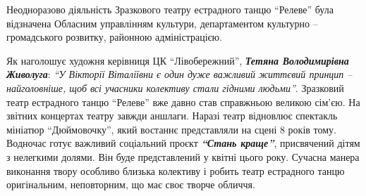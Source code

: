 
Неодноразово діяльність Зразкового театру естрадного танцю \enquote{Релеве} була
відзначена Обласним управлінням культури, департаментом культурно –
громадського розвитку, районною адміністрацією.

Як наголошує художня керівниця ЦК \enquote{Лівобережний}, \emph{\textbf{Тетяна Володимирівна
Живолуга}}: \emph{\enquote{У Вікторії Віталіївни є один дуже важливий життєвий принцип –
найголовніше, щоб всі учасники колективу стали гідними людьми}}. Зразковий театр
естрадного танцю \enquote{Релеве} вже давно став справжньою великою сім'єю. На звітних
концертах театру завжди аншлаги. Наразі театр відновлює спектакль мініатюр
\enquote{Дюймовочку}, який востаннє представляли на сцені 8 років тому. Водночас готує
важливий соціальний проєкт \emph{\textbf{\enquote{Стань краще}}}, присвячений дітям з нелегкими долями.
Він буде представлений у квітні цього року. Сучасна манера виконання твору
особливо близька колективу і робить театр естрадного танцю оригінальним,
неповторним, що має своє творче обличчя.

